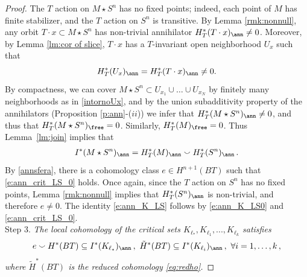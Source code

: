 \documentclass[11pt,a4paper,reqno]{article}
\numberwithin{equation}{section}
\theoremstyle{definition}
\begin{document}
\begin{proof}
The $T$ action on $M\star S^n$ has no fixed points; indeed, each point of $M$ has finite stabilizer, and the $T$ action on $S^n$ is transitive.
By Lemma \ref{rmk:nonnull}, any orbit $T\cdot x\subset M \star S^n$ has non-trivial annihilator $H^*_{T}( T \cdot x)_\ann \neq 0$. Moreover, by Lemma \ref{lm:cor of slice},  $T\cdot x$ has a $T$-invariant open neighborhood $U_x$ such that
\begin{equation}\label{intornoUx}
H^*_{T}(U_x)_\ann = H^*_{T}( T \cdot x)_\ann \neq 0. 
\end{equation}
By compactness, we can cover 
$M \star S^n \subset U_{x_1} \cup \ldots \cup U_{x_N}$ 
by finitely many neighborhoods as in \eqref{intornoUx},
and by  the union subadditivity property of the annihilators (Proposition \ref{p:ann}-($ii$)) 
we infer 
that $H^*_{T}(M \star S^n)_\ann \neq 0 $,
and thus 
that  $H^*_{T}(M \star S^n)_\free=0$. Similarly, $H^*_{T}(M)_\free=0$.
Thus  Lemma~\ref{lm:join} implies that 
\begin{align}
\label{e:ann_K_LS0}
I^*(M \star S^n)_\ann
=
H^*_{T}(M)_\ann\smallsmile H^*_{T}(S^n)_\ann 
\, .
\end{align}
By \eqref{annsfera}, there is a cohomology class 
$e\in H^{n+1}(BT) $ such that 
\eqref{e:ann_crit_LS_0} holds.
Once again, since the $T$ action on $S^n$ has no fixed points, Lemma \ref{rmk:nonnull} implies that $H^*_T(S^n)_\ann$ is non-trivial, and therefore $ e \neq 0 $. The identity  \eqref{e:ann_K_LS} follows by  \eqref{e:ann_K_LS0}
and \eqref{e:ann_crit_LS_0}. 
\\[1mm] 
{\sc Step 3.}
{\it The local cohomology of the critical sets $K_{\ell_*},K_{\ell_1},...,K_{\ell_k}$ satisfies} \begin{align}
\label{e:ann_Kci_LS}
e\smallsmile H^*(BT)\subseteq I^*(K_{\ell_*})_\ann
\, ,
\
\tilde H^*(BT)\subseteq I^*(K_{\ell_i})_\ann 
  \, , \ \forall i =1, \ldots, k   \,  , 
\end{align}
{\it where $\tilde H^*(BT) $
is the reduced cohomology 
 \eqref{eq:redho}.}\vspace{5pt}


\end{proof}
\end{document}
